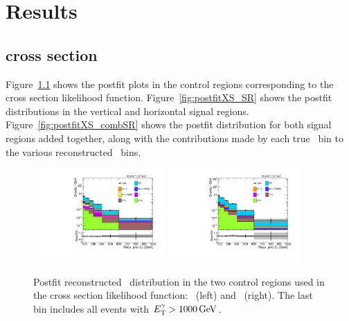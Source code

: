 \chapter{Results} \label{chap:results}
\section{\texorpdfstring{\zinvg}{Z(νν)γ} cross section} \label{sec:results_znng_xsec}
Figure~\ref{fig:postfitXS_CR} shows the postfit plots in the control regions corresponding to the cross section likelihood function.
Figure~\ref{fig:postfitXS_SR} shows the postfit distributions in the vertical and horizontal signal regions.
Figure~\ref{fig:postfitXS_combSR} shows the postfit distribution for both signal regions added together, along with the contributions
made by each true \pTgamma\ bin to the various reconstructed \ETgamma\ bins.

\begin{figure}[htbp]
  \begin{center}
    \includegraphics[width=0.45\textwidth]{figures/xsec_results/Postfit/postfit_weng_phoPt.pdf}
    \includegraphics[width=0.45\textwidth]{figures/xsec_results/Postfit/postfit_wmng_phoPt.pdf}
    \caption{
      Postfit reconstructed \ETgamma\ distribution in the two control regions used in the cross section likelihood function:
      \Pe\Pgamma\ (left) and \Pmu\Pgamma\ (right). The last bin includes all events with $\ETgamma > 1000\unit{GeV}$.
    }
    \label{fig:postfitXS_CR}
  \end{center}
\end{figure}


